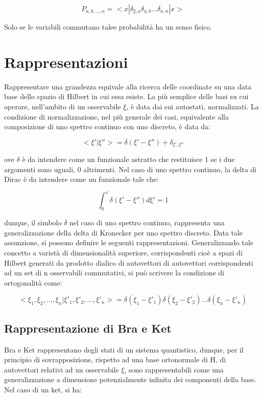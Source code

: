 \documentclass{article}
\begin{document}
\begin{equation}
  P_{a,b,...,n}=<x|\delta_{\xi,a}\delta_{\eta,b}...\delta_{\nu,n}|x>
\end{equation}

Solo se le variabili commutano talee probabilità ha un senso fisico.


\section{Rappresentazioni}
Rappresentare una grandezza equivale alla ricerca delle coordinate su una data base dello spazio di Hilbert in cui essa esiste.
La più semplice delle basi su cui operare, nell'ambito di un osservabile $\xi$, è data dai sui autostati, normalizzati.
La condizione di normalizzazione, nel più generale dei casi, equivalente alla composizione di uno spettro continuo con uno discreto, è data da:

\begin{equation}
<\xi'|\xi''> = \delta(\xi'-\xi'') + \delta_{\xi',\xi''}
\end{equation}

ove $\delta$ è da intendere come un funzionale astratto che restituisce 1 se i due argomenti sono uguali, 0 altrimenti.
Nel caso di uno spettro continuo, la delta di Dirac è da intendere come un funzionale tale che:

\begin{equation}
\int_{0}^{v} \delta(\xi'-\xi'')d\xi' = 1
\end{equation}

dunque, il simbolo $\delta$ nel caso di uno spettro continuo, rappresenta una generalizzazione della delta di Kronecker per uno spettro discreto.
Data tale assunzione, si possono definire le seguenti rappresentazioni.
Generalizzando tale concetto a varietà di dimensionalità superiore, corrispondenti cioè a spazi di Hilbert generati da prodotto dialico
di autovettori di autovettori corrispondenti ad un set di n osservabili commutativi, si può scrivere la condizione di ortogonalità come:

\begin{equation}
    <\xi_1,\xi_2,...,\xi_n|\xi'_1,\xi'_2,...,\xi'_n> = \delta(\xi_1-\xi'_1)\delta(\xi_2-\xi'_2)...\delta(\xi_n-\xi'_n)
\end{equation}

\subsection{Rappresentazione di Bra e Ket}
Bra e Ket rappresentano degli stati di un sistema quantistico, dunque, per il principio di sovrapposizione,
rispetto ad una base ortonormale di H, di autovettori relativi ad un osservabile $\xi$, sono rappresentabili come
una generalizzazione a dimensione potenzialmente infinita dei componenti della base.
Nel caso di un ket, si ha:
\end{document}
